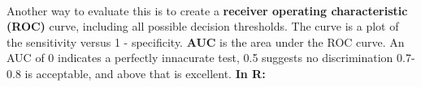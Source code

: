 \documentclass{article}
\begin{document}
\\ Another way to evaluate this is to create a \textbf{receiver operating characteristic (ROC)} curve, including all possible decision thresholds. The curve is a plot of the sensitivity versus 1 - specificity. \textbf{AUC} is the area under the ROC curve. An AUC of 0 indicates a perfectly innacurate test, 0.5 suggests no discrimination 0.7-0.8 is acceptable, and above that is excellent.
\textbf{In R:}
\begin{Schunk}
\end{Schunk}
\end{document}
